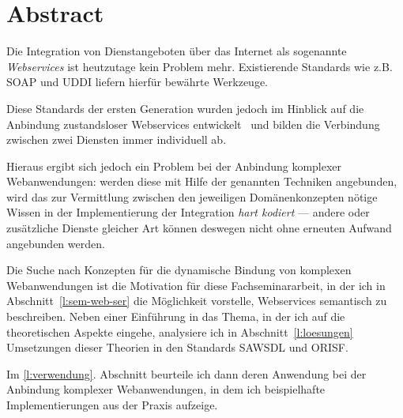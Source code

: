 \section*{Abstract}

Die Integration von Dienstangeboten über das Internet als sogenannte 
\emph{Webservices} ist heutzutage kein Problem mehr. Existierende Standards
wie z.B. \ac{SOAP} und \ac{UDDI} liefern hierfür bewährte Werkzeuge.

Diese Standards der ersten Generation wurden jedoch im Hinblick auf 
die Anbindung zustandsloser Webservices entwickelt~\cite[S. 653]{ei-sawsdl} 
und bilden die Verbindung zwischen zwei Diensten immer individuell ab.

Hieraus ergibt sich jedoch ein Problem bei der Anbindung komplexer 
Webanwendungen: werden diese mit Hilfe der genannten Techniken 
angebunden, wird das zur Vermittlung zwischen den jeweiligen Domänenkonzepten
nötige Wissen in der Implementierung der Integration \emph{hart kodiert} --- 
andere oder zusätzliche Dienste gleicher Art können deswegen nicht ohne erneuten
Aufwand angebunden werden.

Die Suche nach Konzepten für die dynamische Bindung von komplexen Webanwendungen
ist die Motivation für diese Fachseminararbeit, in der ich in Abschnitt~\ref{l:sem-web-ser} die Möglichkeit vorstelle, Webservices semantisch zu beschreiben. Neben einer Einführung in das Thema, in der ich auf die theoretischen Aspekte eingehe, analysiere ich in Abschnitt~\ref{l:loesungen} Umsetzungen dieser Theorien in den Standards \ac{SAWSDL} und \ac{ORISF}.

Im \ref{l:verwendung}. Abschnitt beurteile ich dann deren Anwendung bei der Anbindung 
komplexer Webanwendungen, in dem ich beispielhafte Implementierungen aus der Praxis aufzeige.

